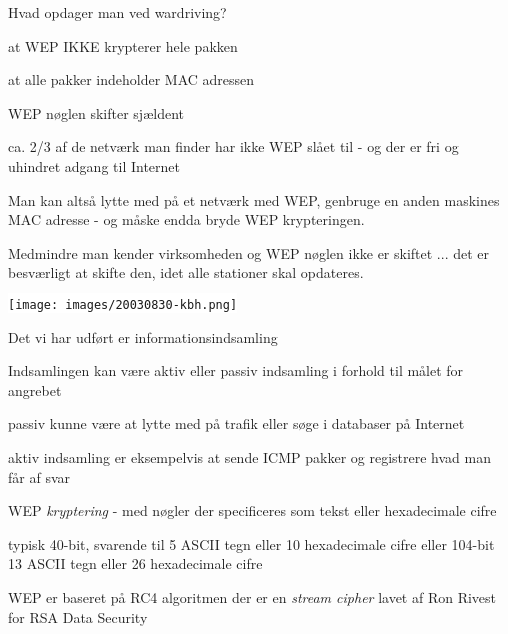 \documentclass[Screen16to9,17pt]{foils}
\begin{document}

\begin{list1}
\item Hvad opdager man ved wardriving?
\begin{list2}
\item at WEP IKKE krypterer hele pakken
\item at alle pakker indeholder MAC adressen
\item WEP nøglen skifter sjældent
\item ca. 2/3 af de netværk man finder har ikke WEP slået til - og der
  er fri og uhindret adgang til Internet
\end{list2}
\item {\color{red}
Man kan altså lytte med på et netværk med WEP, genbruge en anden
maskines MAC adresse - og måske endda bryde WEP krypteringen.}
\item
Medmindre man kender virksomheden og WEP nøglen ikke er skiftet ...
det er besværligt at skifte den, idet alle stationer skal opdateres.
\end{list1}


\begin{center}
\colorbox{white}{\texttt{[image: images/20030830-kbh.png]}}
\end{center}




\begin{list1}
\item Det vi har udført er informationsindsamling
\item Indsamlingen kan være aktiv eller passiv indsamling i forhold
  til målet for angrebet
\item passiv kunne være at lytte med på trafik eller søge i databaser
  på Internet
\item aktiv indsamling er eksempelvis at sende ICMP pakker og
  registrere hvad man får af svar
\end{list1}


\begin{list1}
\item WEP \emph{kryptering} - med nøgler der specificeres som tekst
  eller hexadecimale cifre
\item typisk 40-bit, svarende til 5 ASCII tegn eller 10 hexadecimale
  cifre eller 104-bit 13 ASCII tegn eller 26 hexadecimale cifre
\item WEP er baseret på RC4 algoritmen der er en \emph{stream cipher}
  lavet af Ron Rivest for RSA Data Security
\end{list1}
\end{document}

